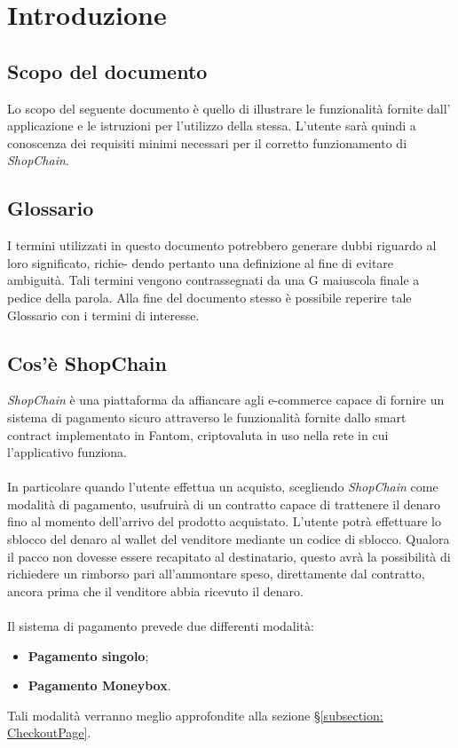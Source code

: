 \section{Introduzione}\label{section:introduzione}

\subsection{Scopo del documento}
Lo scopo del seguente documento è quello di illustrare le funzionalità fornite dall' applicazione e le istruzioni per l'utilizzo della stessa.
L'utente sarà quindi a conoscenza dei requisiti minimi necessari per il corretto funzionamento di \textit{ShopChain}.

\subsection{Glossario}
I termini utilizzati in questo documento potrebbero generare dubbi riguardo al loro significato, richie-
dendo pertanto una definizione al fine di evitare ambiguità. Tali termini vengono contrassegnati da
una G maiuscola finale a pedice della parola. Alla fine del documento stesso è possibile reperire tale Glossario con i termini di interesse.

\subsection{Cos'è ShopChain}
\textit{ShopChain} è una piattaforma da affiancare agli e-commerce\glo{} capace di fornire un sistema di pagamento sicuro attraverso le funzionalità fornite dallo smart contract\glo{} implementato in Fantom\glo{}, criptovaluta\glo{} in uso nella rete in cui l'applicativo funziona.\\\\
In particolare quando l'utente effettua un acquisto, scegliendo \textit{ShopChain} come modalità di pagamento, usufruirà di un contratto capace di trattenere il denaro fino al momento dell'arrivo del prodotto acquistato. L'utente potrà effettuare lo sblocco del denaro al wallet\glo{} del venditore mediante un codice di sblocco. Qualora il pacco non dovesse essere recapitato al destinatario, questo avrà la possibilità di richiedere un rimborso pari all'ammontare speso, direttamente dal contratto, ancora prima che il venditore abbia ricevuto il denaro.\\\\
Il sistema di pagamento prevede due differenti modalità:
\begin{itemize}
    \item \textbf{Pagamento singolo};
    \item  \textbf{Pagamento Moneybox}.
\end{itemize}
Tali modalità verranno meglio approfondite alla sezione §\ref{subsection: CheckoutPage}.

